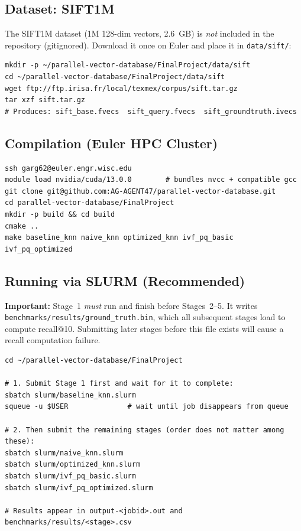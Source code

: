 \documentclass[12pt]{article}
\begin{document}
\subsection*{Dataset: SIFT1M}

The SIFT1M dataset (1M 128-dim vectors, 2.6~GB) is \emph{not} included in the
repository (gitignored). Download it once on Euler and place it in
\texttt{data/sift/}:

\begin{lstlisting}[style=terminal]
mkdir -p ~/parallel-vector-database/FinalProject/data/sift
cd ~/parallel-vector-database/FinalProject/data/sift
wget ftp://ftp.irisa.fr/local/texmex/corpus/sift.tar.gz
tar xzf sift.tar.gz
# Produces: sift_base.fvecs  sift_query.fvecs  sift_groundtruth.ivecs
\end{lstlisting}

\subsection*{Compilation (Euler HPC Cluster)}
\begin{lstlisting}[style=terminal]
ssh garg62@euler.engr.wisc.edu
module load nvidia/cuda/13.0.0        # bundles nvcc + compatible gcc
git clone git@github.com:AG-AGENT47/parallel-vector-database.git
cd parallel-vector-database/FinalProject
mkdir -p build && cd build
cmake ..
make baseline_knn naive_knn optimized_knn ivf_pq_basic ivf_pq_optimized
\end{lstlisting}

\subsection*{Running via SLURM (Recommended)}

\textbf{Important:} Stage~1 \emph{must} run and finish before Stages~2--5.
It writes \texttt{benchmarks/results/ground\_truth.bin}, which all subsequent
stages load to compute recall@10. Submitting later stages before this file
exists will cause a recall computation failure.

\begin{lstlisting}[style=terminal]
cd ~/parallel-vector-database/FinalProject

# 1. Submit Stage 1 first and wait for it to complete:
sbatch slurm/baseline_knn.slurm
squeue -u $USER              # wait until job disappears from queue

# 2. Then submit the remaining stages (order does not matter among these):
sbatch slurm/naive_knn.slurm
sbatch slurm/optimized_knn.slurm
sbatch slurm/ivf_pq_basic.slurm
sbatch slurm/ivf_pq_optimized.slurm

# Results appear in output-<jobid>.out and benchmarks/results/<stage>.csv
\end{lstlisting}
\end{document}
